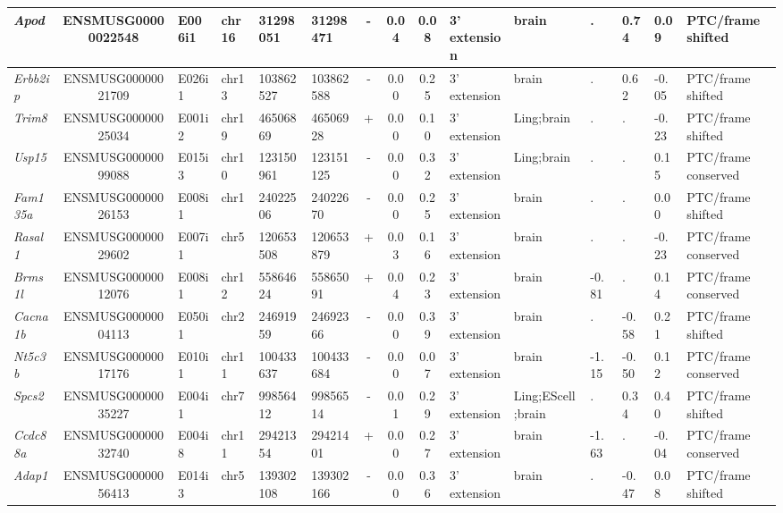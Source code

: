 \begin{appendices}
\begin{landscape}
\begin{table}[htbp]
{\begin{tabular}{|l|c|l|l|l|l|c|c|c|l|l|l|l|l|l|}
		\textit{Apod} & ENSMUSG00000022548 & E006i1 & chr16 & 31298051 & 31298471 & -     & 0.04  & 0.08  & 3' extension & brain & .     & 0.74  & 0.09  & PTC/frame shifted \\ \hline
		\textit{Erbb2ip} & ENSMUSG00000021709 & E026i1 & chr13 & 103862527 & 103862588 & -     & 0.00  & 0.25  & 3' extension & brain & .     & 0.62  & -0.05 & PTC/frame shifted \\ \hline
		\textit{Trim8} & ENSMUSG00000025034 & E001i2 & chr19 & 46506869 & 46506928 & +     & 0.00  & 0.10  & 3' extension & Ling;brain & .     & .     & -0.23 & PTC/frame shifted \\ \hline
		\textit{Usp15} & ENSMUSG00000099088 & E015i3 & chr10 & 123150961 & 123151125 & -     & 0.00  & 0.32  & 3' extension & Ling;brain & .     & .     & 0.15  & PTC/frame conserved \\ \hline
		\textit{Fam135a} & ENSMUSG00000026153 & E008i1 & chr1  & 24022506 & 24022670 & -     & 0.00  & 0.25  & 3' extension & brain & .     & .     & 0.00  & PTC/frame shifted \\ \hline
		\textit{Rasal1} & ENSMUSG00000029602 & E007i1 & chr5  & 120653508 & 120653879 & +     & 0.03  & 0.16  & 3' extension & brain & .     & .     & -0.23 & PTC/frame conserved \\ \hline
		\textit{Brms1l} & ENSMUSG00000012076 & E008i1 & chr12 & 55864624 & 55865091 & +     & 0.04  & 0.23  & 3' extension & brain & -0.81 & .     & 0.14  & PTC/frame conserved \\ \hline
		\textit{Cacna1b} & ENSMUSG00000004113 & E050i1 & chr2  & 24691959 & 24692366 & -     & 0.00  & 0.39  & 3' extension & brain & .     & -0.58 & 0.21  & PTC/frame shifted \\ \hline
		\textit{Nt5c3b} & ENSMUSG00000017176 & E010i1 & chr11 & 100433637 & 100433684 & -     & 0.00  & 0.07  & 3' extension & brain & -1.15 & -0.50 & 0.12  & PTC/frame conserved \\ \hline
		\textit{Spcs2} & ENSMUSG00000035227 & E004i1 & chr7  & 99856412 & 99856514 & -     & 0.01  & 0.29  & 3' extension & Ling;EScell;brain & .     & 0.34  & 0.40  & PTC/frame shifted \\ \hline
		\textit{Ccdc88a} & ENSMUSG00000032740 & E004i8 & chr11 & 29421354 & 29421401 & +     & 0.00  & 0.27  & 3' extension & brain & -1.63 & .     & -0.04 & PTC/frame conserved \\ \hline
		\textit{Adap1} & ENSMUSG00000056413 & E014i3 & chr5  & 139302108 & 139302166 & -     & 0.00  & 0.36  & 3' extension & brain & .     & -0.47 & 0.08  & PTC/frame shifted \\ \hline

\end{tabular}}
\end{table}
\end{landscape}
\end{appendices}
